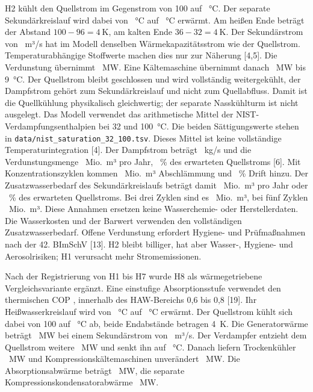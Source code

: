 H2 kühlt den Quellstrom im Gegenstrom von 100 auf \EvapSourceOutlet~°C. Der separate Sekundärkreislauf wird dabei von \EvapSecondaryInlet~°C auf \EvapSecondaryOutlet~°C erwärmt. Am heißen Ende beträgt der Abstand \(100-96=4~\mathrm{K}\), am kalten Ende \(36-32=4~\mathrm{K}\). Der Sekundärstrom von \EvapSecondaryFlow~m³/s hat im Modell denselben Wärmekapazitätsstrom wie der Quellstrom. Temperaturabhängige Stoffwerte machen dies nur zur Näherung [4,5]. Die Verdunstung übernimmt \EvapDry~MW. Eine Kältemaschine übernimmt danach \EvapChiller~MW bis 9~°C. Der Quellstrom bleibt geschlossen und wird vollständig weitergekühlt, der Dampfstrom gehört zum Sekundärkreislauf und nicht zum Quellabfluss. Damit ist die Quellkühlung physikalisch gleichwertig; der separate Nasskühlturm ist nicht ausgelegt. Das Modell verwendet das arithmetische Mittel der NIST-Verdampfungsenthalpien bei 32 und 100~°C. Die beiden Sättigungswerte stehen in \texttt{data/nist\_saturation\_32\_100.tsv}. Dieses Mittel ist keine vollständige Temperaturintegration [4]. Der Dampfstrom beträgt \EvapRate~kg/s und die Verdunstungsmenge \EvapAnnual~Mio.~m³ pro Jahr, \EvapFraction~\% des erwarteten Quellstroms [6]. Mit \EvapCycles Konzentrationszyklen kommen \EvapBlowdownAnnual~Mio.~m³ Abschlämmung und \EvapDriftPercent~\% Drift hinzu. Der Zusatzwasserbedarf des Sekundärkreislaufs beträgt damit \EvapMakeupAnnual~Mio.~m³ pro Jahr oder \EvapMakeupFraction~\% des erwarteten Quellstroms. Bei drei Zyklen sind es \EvapMakeupHigh~Mio.~m³, bei fünf Zyklen \EvapMakeupLow~Mio.~m³. Diese Annahmen ersetzen keine Wasserchemie- oder Herstellerdaten. Die Wasserkosten und der Barwert verwenden den vollständigen Zusatzwasserbedarf. Offene Verdunstung erfordert Hygiene- und Prüfmaßnahmen nach der 42. BImSchV [13]. H2 bleibt billiger, hat aber Wasser-, Hygiene- und Aerosolrisiken; H1 verursacht mehr Stromemissionen.

Nach der Registrierung von H1 bis H7 wurde H8 als wärmegetriebene Vergleichsvariante ergänzt. Eine einstufige Absorptionsstufe verwendet den thermischen COP \AbsThermalCop, innerhalb des HAW-Bereichs 0,6 bis 0,8 [19]. Ihr Heißwasserkreislauf wird von \AbsHotReturn~°C auf \AbsHotInlet~°C erwärmt. Der Quellstrom kühlt sich dabei von 100 auf \AbsSourceAfterGenerator~°C ab, beide Endabstände betragen 4~K. Die Generatorwärme beträgt \AbsGenerator~MW bei einem Sekundärstrom von \AbsSecondaryFlow~m³/s. Der Verdampfer entzieht dem Quellstrom weitere \AbsEvaporator~MW und senkt ihn auf \AbsSourceAfterEvaporator~°C. Danach liefern Trockenkühler \AbsDryCooling~MW und Kompressionskältemaschinen unverändert \AbsChiller~MW. Die Absorptionsabwärme beträgt \AbsRejection~MW, die separate Kompressionskondensatorabwärme \AbsCondenser~MW.

